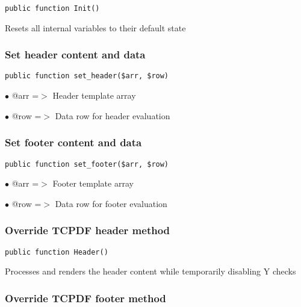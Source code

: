 \documentclass[a4paper]{article}
\begin{document}
\begin{lstlisting}
public function Init()
\end{lstlisting}

Resets all internal variables to their default state

\hypertarget{toc504}{}
\subsubsection{Set header content and data}

\begin{lstlisting}
public function set_header($arr, $row)
\end{lstlisting}

\begin{compactitem}
\item[\color{myblue}$\bullet$] @arr =$>$ Header template array
\item[\color{myblue}$\bullet$] @row =$>$ Data row for header evaluation
\end{compactitem}

\hypertarget{toc505}{}
\subsubsection{Set footer content and data}

\begin{lstlisting}
public function set_footer($arr, $row)
\end{lstlisting}

\begin{compactitem}
\item[\color{myblue}$\bullet$] @arr =$>$ Footer template array
\item[\color{myblue}$\bullet$] @row =$>$ Data row for footer evaluation
\end{compactitem}

\hypertarget{toc506}{}
\subsubsection{Override TCPDF header method}

\begin{lstlisting}
public function Header()
\end{lstlisting}

Processes and renders the header content while temporarily disabling Y checks

\hypertarget{toc507}{}
\subsubsection{Override TCPDF footer method}
\end{document}
